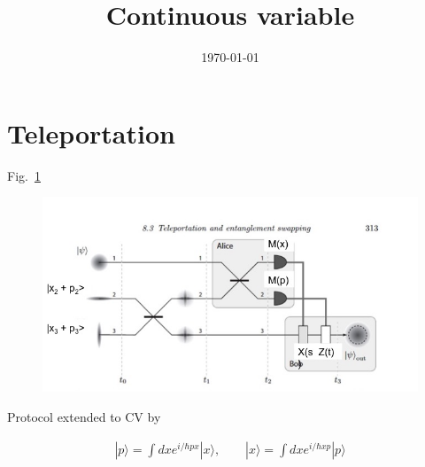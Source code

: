 \documentclass[reprint,
superscriptaddress,
 amsmath,amssymb,
 aps,
prb,
]{revtex4-1}
\newcommand{\ket}[1]{|{#1}\rangle}
\begin{document}

\title{Continuous variable }




\begin{abstract}

\end{abstract}

\date{\today}

\maketitle

% 












\section{Teleportation}
Fig.~\ref{fig:tele}
\begin{widetext}
\begin{figure}[h!]
\includegraphics[trim = 0cm 0cm 0cm 0cm, clip, width=1.6\linewidth]{teleport.jpg}
\caption{\label{fig:tele}}
\end{figure} 


\end{widetext}


Protocol extended to CV by \cite{PhysRevA.49.1473,PhysRevLett.80.869}

\cite{kok2010introduction}
\begin{align}
\ket{p} = \int dx e^{i/\hbar p x} \ket{x}, \qquad 
\ket{x} = \int dx e^{i/\hbar x p} \ket{p}
\end{align}
\end{document}
